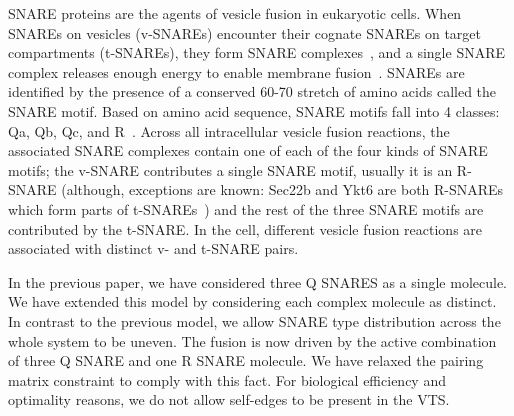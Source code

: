 SNARE proteins are the agents of vesicle fusion in eukaryotic cells. When SNAREs on vesicles (v-SNAREs) encounter their cognate SNAREs on target compartments (t-SNAREs), they form SNARE complexes~\cite{jahn2006snares}, and a single SNARE complex releases enough energy to enable membrane fusion~\cite{van2010one}. SNAREs are identified by the presence of a conserved 60-70 stretch of amino acids called the SNARE motif. Based on amino acid sequence, SNARE motifs fall into 4 classes: Qa, Qb, Qc, and R~\cite{jahn2006snares}. Across all intracellular vesicle fusion reactions, the associated SNARE complexes contain one of each of the four kinds of SNARE motifs; the v-SNARE contributes a single SNARE motif, usually it is an R-SNARE (although, exceptions are known: Sec22b and Ykt6 are both R-SNAREs which form parts of t-SNAREs~\cite{hong2005snares}) and the rest of the three SNARE
motifs are contributed by the t-SNARE. In the cell, different vesicle fusion reactions are associated with distinct v- and t-SNARE pairs.

In the previous paper, we have considered three Q SNARES as a single molecule. We have extended this model by considering each complex molecule as distinct. In contrast to the previous model, we allow SNARE type distribution across the whole system to be uneven. The fusion is now driven by the active combination of three Q SNARE and one R SNARE molecule. We have relaxed the pairing matrix constraint to comply with this fact. For biological efficiency and optimality reasons, we do not allow self-edges to be present in the VTS. 


